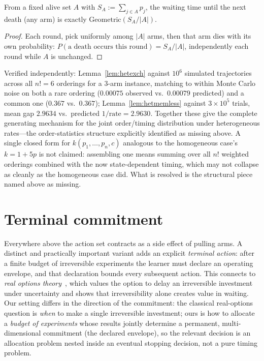\begin{lemma}
\label{lem:hetmemless}
From a fixed alive set $A$ with $S_A := \sum_{j\in A} p_j$, the waiting time
until the next death (any arm) is exactly $\mathrm{Geometric}(S_A/|A|)$.
\end{lemma}

\begin{proof}
Each round, pick uniformly among $|A|$ arms, then that arm dies with its own
probability: $P(\text{a death occurs this round}) = S_A/|A|$, independently
each round while $A$ is unchanged.
\end{proof}

Verified independently: Lemma~\ref{lem:hetexch} against $10^6$ simulated
trajectories across all $n!=6$ orderings for a 3-arm instance, matching to
within Monte Carlo noise on both a rare ordering ($0.00075$ observed vs.\
$0.00079$ predicted) and a common one ($0.367$ vs.\ $0.367$);
Lemma~\ref{lem:hetmemless} against $3\times10^5$ trials, mean gap $2.9634$ vs.\
predicted $1/\mathrm{rate}=2.9630$. Together these give the complete
generating mechanism for the joint order/timing distribution under
heterogeneous rates---the order-statistics structure explicitly identified as
missing above. A single closed form for $k(p_1,\dots,p_n,c)$ analogous to the
homogeneous case's $k=1+5p$ is not claimed: assembling one means summing over
all $n!$ weighted orderings combined with the now state-dependent timing,
which may not collapse as cleanly as the homogeneous case did. What is
resolved is the structural piece named above as missing.

\section{Terminal commitment}
\label{sec:commitment}

Everywhere above the action set contracts as a side effect of pulling arms. A
distinct and practically important variant adds an explicit \emph{terminal action}:
after a finite budget of irreversible experiments the learner must declare an
operating envelope, and that declaration bounds every subsequent action. This
connects to \emph{real options theory}~\citep{dixitpindyck1994}, which values the
option to delay an irreversible investment under uncertainty and shows that
irreversibility alone creates value in waiting. Our setting differs in the
direction of the commitment: the classical real-options question is
\emph{when} to make a single irreversible investment; ours is how to allocate a
\emph{budget of experiments} whose results jointly determine a permanent,
multi-dimensional commitment (the declared envelope), so the relevant decision
is an allocation problem nested inside an eventual stopping decision, not a
pure timing problem.


